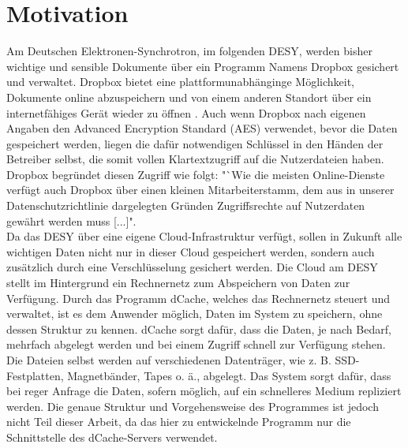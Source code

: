 \documentclass[10pt, a4paper,headsepline,pointednumbers]{scrreprt}
\begin{document}
\section{Motivation}
Am Deutschen Elektronen-Synchrotron, im folgenden DESY, werden bisher wichtige und sensible Dokumente über ein Programm Namens Dropbox gesichert und verwaltet. Dropbox bietet eine plattformunabhänginge Möglichkeit, Dokumente online abzuspeichern und von einem anderen Standort über ein internetfähiges Gerät wieder zu öffnen \cite{website:dropbox-main}. Auch wenn Dropbox nach eigenen Angaben den Advanced Encryption Standard (AES)  verwendet, bevor die Daten gespeichert werden, liegen die dafür notwendigen Schlüssel in den Händen der Betreiber selbst, die somit vollen Klartextzugriff auf die Nutzerdateien haben. Dropbox begründet diesen Zugriff wie folgt:  "`Wie die meisten Online-Dienste verfügt auch Dropbox über einen kleinen Mitarbeiterstamm, dem aus in unserer Datenschutzrichtlinie dargelegten Gründen Zugriffsrechte auf Nutzerdaten gewährt werden muss [...]". \cite{website:dropbox-help} \\
Da das DESY über eine eigene Cloud-Infrastruktur verfügt, sollen in Zukunft alle wichtigen Daten nicht nur in dieser Cloud gespeichert werden, sondern auch zusätzlich durch eine Verschlüsselung gesichert werden. Die Cloud am DESY stellt im Hintergrund ein Rechnernetz zum Abspeichern von Daten zur Verfügung. Durch das Programm dCache, welches das Rechnernetz steuert und verwaltet, ist es dem Anwender möglich, Daten im System zu speichern, ohne dessen Struktur zu kennen. dCache sorgt dafür, dass die Daten, je nach Bedarf, mehrfach abgelegt werden und bei einem Zugriff schnell zur Verfügung stehen. Die Dateien selbst werden auf verschiedenen Datenträger, wie z. B. SSD-Festplatten, Magnetbänder, Tapes o. ä., abgelegt. Das System sorgt dafür, dass bei reger Anfrage die Daten, sofern möglich, auf ein schnelleres Medium repliziert werden. Die genaue Struktur und Vorgehensweise des Programmes ist jedoch nicht Teil dieser Arbeit, da das hier zu entwickelnde Programm nur die Schnittstelle des dCache-Servers verwendet.
\end{document}
